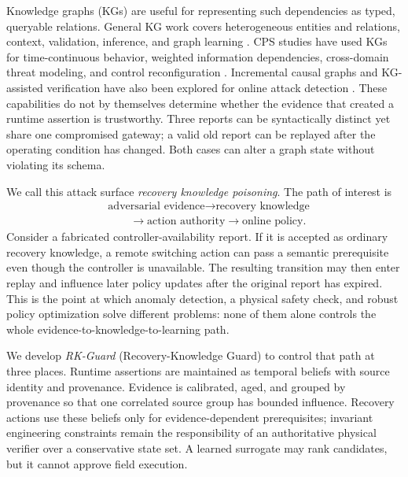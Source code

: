 Knowledge graphs (KGs) are useful for representing such dependencies as typed, queryable relations. General KG work covers heterogeneous entities and relations, context, validation, inference, and graph learning \cite{hogan2021knowledgegraphs,reinanda2020knowledge}. CPS studies have used KGs for time-continuous behavior, weighted information dependencies, cross-domain threat modeling, and control reconfiguration \cite{liu2025timecontinuous,wang2025weightedkg,wu2026multidimensional,knowledge2025dynamic}. Incremental causal graphs and KG-assisted verification have also been explored for online attack detection \cite{incremental2026causal,hybridtcdf2026}. These capabilities do not by themselves determine whether the evidence that created a runtime assertion is trustworthy. Three reports can be syntactically distinct yet share one compromised gateway; a valid old report can be replayed after the operating condition has changed. Both cases can alter a graph state without violating its schema.

We call this attack surface \emph{recovery knowledge poisoning}. The path of interest is
\begin{align}
\label{eq-intro-propagation}
&\text{adversarial evidence}\rightarrow\text{recovery knowledge}\nonumber\\
&\qquad\rightarrow\text{action authority}\rightarrow\text{online policy}.
\end{align}
Consider a fabricated controller-availability report. If it is accepted as ordinary recovery knowledge, a remote switching action can pass a semantic prerequisite even though the controller is unavailable. The resulting transition may then enter replay and influence later policy updates after the original report has expired. This is the point at which anomaly detection, a physical safety check, and robust policy optimization solve different problems: none of them alone controls the whole evidence-to-knowledge-to-learning path.

We develop \emph{RK-Guard} (Recovery-Knowledge Guard) to control that path at three places. Runtime assertions are maintained as temporal beliefs with source identity and provenance. Evidence is calibrated, aged, and grouped by provenance so that one correlated source group has bounded influence. Recovery actions use these beliefs only for evidence-dependent prerequisites; invariant engineering constraints remain the responsibility of an authoritative physical verifier over a conservative state set. A learned surrogate may rank candidates, but it cannot approve field execution.

